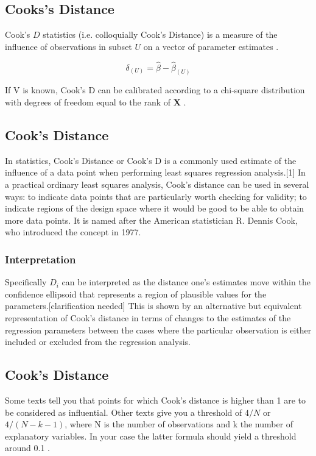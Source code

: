 \documentclass[12pt, a4paper]{article}
\begin{document}
\subsection{Cooks's Distance}%
 Cook's $D$ statistics (i.e. colloquially Cook's Distance) is a measure of the influence of observations in subset $U$ on a vector of parameter estimates \citep{cook77}.

\[ \delta_{(U)} = \hat{\beta} - \hat{\beta}_{(U)}\]

If V is known, Cook's D can be calibrated according to a chi-square distribution with degrees of freedom equal to the rank of $\boldsymbol{X}$ \citep{cpj92}.

\subsection{Cook's Distance}
In statistics, Cook's Distance or Cook's D is a commonly used estimate of the influence of a data point when performing least squares regression analysis.[1] In a practical ordinary least squares analysis, Cook's distance can be used in several ways: to indicate data points that are particularly worth checking for validity; to indicate regions of the design space where it would be good to be able to obtain more data points. It is named after the American statistician R. Dennis Cook, who introduced the concept in 1977.


\subsubsection{Interpretation}
Specifically $D_i$ can be interpreted as the distance one's estimates move within the confidence ellipsoid that represents a region of plausible values for the parameters.[clarification needed] This is shown by an alternative but equivalent representation of Cook's distance in terms of changes to the estimates of the regression parameters between the cases where the particular observation is either included or excluded from the regression analysis.

\newpage


\subsection{Cook's Distance}
Some texts tell you that points for which Cook's distance is higher than 1 are to be considered as influential. Other texts give you a threshold of $4/N$ or $4/(N−k−1)$, where N is the number of observations and k the number of explanatory variables. In your case the latter formula should yield a threshold around 0.1 .
\end{document}
